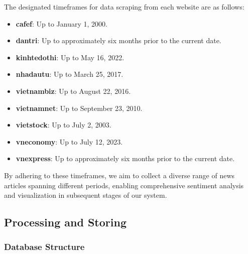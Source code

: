 {The designated timeframes for data scraping from each website are as follows:
\begin{itemize}
  \item \textbf{cafef\cite{cafef}}: Up to January 1, 2000.
  \item \textbf{dantri\cite{dantri}}: Up to approximately six months prior to the current date.
  \item \textbf{kinhtedothi\cite{kinhtedothi}}: Up to May 16, 2022.
  \item \textbf{nhadautu\cite{nhadautu}}: Up to March 25, 2017.
  \item \textbf{vietnambiz\cite{vietnambiz}}: Up to August 22, 2016.
  \item \textbf{vietnamnet\cite{vietnamnet}}: Up to September 23, 2010.
  \item \textbf{vietstock\cite{vietstock}}: Up to July 2, 2003.
  \item \textbf{vneconomy\cite{vneconomy}}: Up to July 12, 2023.
  \item \textbf{vnexpress\cite{vnexpress}}: Up to approximately six months prior to the current date.
\end{itemize}
By adhering to these timeframes, we aim to collect a diverse range of news articles spanning different periods, enabling comprehensive sentiment analysis and visualization in subsequent stages of our system.

\subsection{Processing and Storing}
\subsubsection{Database Structure}

}
